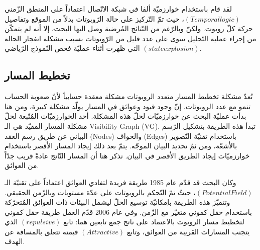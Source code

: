  لقد قام \cite{b6} باستخدام خوارزميّة ألفا في شبكة الاتّصال اعتماداً على المنطق الزّمني $ (Temporal logic) $، حيث تمّ التّركيز على حالة الرّوبوتات بدلاً من الموقع وتفاصيل حركة كلّ روبوت. ولكنّ وبالرّغم من النّتائج المُرضية وصل اليها البحث، إلا أنه لم يتمكّن من إجراء عملية التّحليل سوى على عدد قليل من الرّوبوتات بسبب مشكلة انفجار الحالة $ (state explosion) $ التي ظهرت أثناء عمليّة فحص النّموذج الرّياضي. 
 
 \subsection{تخطيط المسار}
 
 تُعدّ مشكلة تخطيط المسار متعدد الروبوتات مشكلة معقدة حسابياّ لأنّ صعوبة الحساب تنمو مع عدد الروبوتات. إنّ وجود قيود وعوائق في المسار يولّد مشكلة كبيرة، ومن هنا بدأت عمليّة البحث عن خوارزميّات لحلّ هذه المشكلة. أحد الخوارزميّات المُتّبعة لحلّ مشكلة المسار المقيّد هي الـ \textenglish{Visibility Graph (VG)}. تبدأ هذه الطريقة بتشكيل الرّسم البياني عن طريق رسم العقد (Nodes) والحواف (Edges) باستخدام تقنيّة التّصوير بالأشعّة، ومن ثمّ تحديد البيان الموجّه. يتمّ بعد ذلك إيجاد المسار الأقصر باستخدام خوارزميّات إيجاد الطريق الأقصر في البيان. نذكر هنا أن المسار النّاتج عادةً قريب جدّاً من العوائق.
 
 وكان البحث \cite{b8} قد قدّم عام 1985 طريقة فريدة لتفادي العوائق اعتماداً على تقنيّة الـ $ (Potential Field) $، حيثُ تمّ التّحكم بالروبوتات على عدّة مستويات وبالزّمن الحقيقي. وتتميّز هذه الطريقة بإمكانيّة توسيع الحلّ ليشمل البيئات ذات العوائق المُتحرّكة باستخدام حقل كموني متغيّر مع الزّمن.  وفي عام 2006 قدّم العمل \cite{b9} طريقة حقل كموني لتخطيط مسار الروبوت بالاعتماد على ناتج جمع تابعين هما: تابع $ (repulsive) $ الذي يتجنب المسارات القريبة من العوائق، وتابع $  (Attractive) $ قيمته تتعلق بالمسافة عن الهدف.
 
